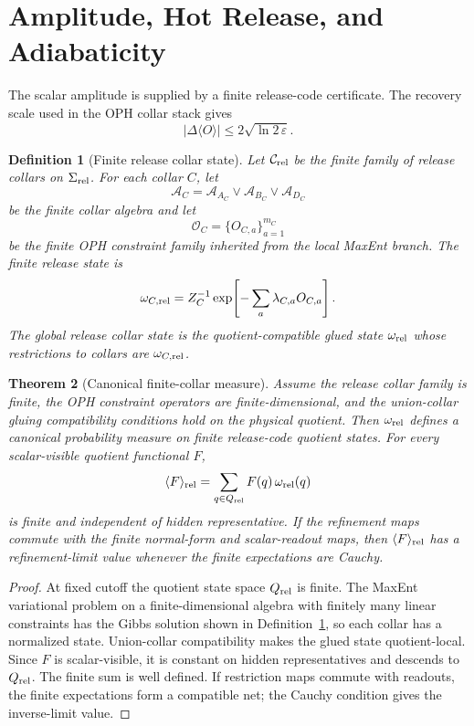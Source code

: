\documentclass[11pt]{article}
\newtheorem{theorem}{Theorem}[section]
\newtheorem{definition}[theorem]{Definition}
\begin{document}
\section{Amplitude, Hot Release, and Adiabaticity}

The scalar amplitude is supplied by a finite release-code certificate. The recovery scale used in
the OPH collar stack gives
\[
|\Delta\langle O\rangle|\le2\sqrt{\ln 2\,\varepsilon}.
\]

\begin{definition}[Finite release collar state]\label{def:finite-release-collar-state}
Let \(\mathcal C_{\rm rel}\) be the finite family of release collars on
\(\Sigma_{\rm rel}\). For each collar \(C\), let
\[
\mathcal A_C
=
\mathcal A_{A_C}\vee\mathcal A_{B_C}\vee\mathcal A_{D_C}
\]
be the finite collar algebra and let
\[
\mathcal O_C=\{O_{C,a}\}_{a=1}^{m_C}
\]
be the finite OPH constraint family inherited from the local MaxEnt branch. The finite release state
is
\[
\omega_{C,\rm rel}
=
Z_C^{-1}
\exp\!\left[-\sum_a\lambda_{C,a}O_{C,a}\right].
\]
The global release collar state is the quotient-compatible glued state \(\omega_{\rm rel}\) whose
restrictions to collars are \(\omega_{C,\rm rel}\).
\end{definition}

\begin{theorem}[Canonical finite-collar measure]\label{thm:canonical-release-measure}
Assume the release collar family is finite, the OPH constraint operators are finite-dimensional,
and the union-collar gluing compatibility conditions hold on the physical quotient. Then
\(\omega_{\rm rel}\) defines a canonical probability measure on finite release-code quotient
states. For every scalar-visible quotient functional \(F\),
\[
\langle F\rangle_{\rm rel}
=
\sum_{q\in Q_{\rm rel}}F(q)\,\omega_{\rm rel}(q)
\]
is finite and independent of hidden representative. If the refinement maps commute with the finite
normal-form and scalar-readout maps, then \(\langle F\rangle_{\rm rel}\) has a refinement-limit
value whenever the finite expectations are Cauchy.
\end{theorem}

\begin{proof}
At fixed cutoff the quotient state space \(Q_{\rm rel}\) is finite. The MaxEnt variational problem
on a finite-dimensional algebra with finitely many linear constraints has the Gibbs solution shown
in Definition~\ref{def:finite-release-collar-state}, so each collar has a normalized state.
Union-collar compatibility makes the glued state quotient-local. Since \(F\) is scalar-visible, it
is constant on hidden representatives and descends to \(Q_{\rm rel}\). The finite sum is well
defined. If restriction maps commute with readouts, the finite expectations form a compatible net;
the Cauchy condition gives the inverse-limit value.
\end{proof}
\end{document}
